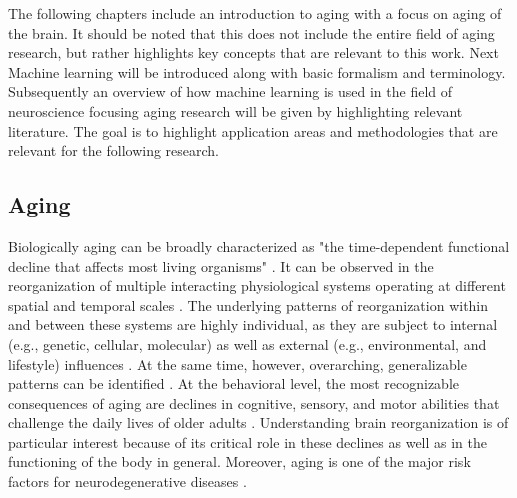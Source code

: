 The following chapters include an introduction to aging with a focus on aging of the brain. It should be noted that this does not include the entire field of aging research, but rather highlights key concepts that are relevant to this work. Next Machine learning will be introduced along with basic formalism and terminology. Subsequently an overview of how machine learning is used in the field of neuroscience focusing aging research will be given by highlighting relevant literature. The goal is to highlight application areas and methodologies that are relevant for the following research.

\subsection{Aging}
Biologically aging can be broadly characterized as "the time-dependent functional decline that affects most living organisms" \cite{López-Otín2013}. It can be observed in the reorganization of multiple interacting physiological systems operating at different spatial and temporal scales \cite{Mooney2016}. The underlying patterns of reorganization within and between these systems are highly individual, as they are subject to internal (e.g., genetic, cellular, molecular) as well as external (e.g., environmental, and lifestyle) influences \cite{Smith2020, Mooney2016, Cohen2022}. At the same time, however, overarching, generalizable patterns can be identified \cite{Salthouse2019}. At the behavioral level, the most recognizable consequences of aging are declines in cognitive, sensory, and motor abilities that challenge the daily lives of older adults \cite{Li2002}. Understanding brain reorganization is of particular interest because of its critical role in these declines as well as in the functioning of the body in general. Moreover, aging is one of the major risk factors for neurodegenerative diseases \cite{Hou2019}.

